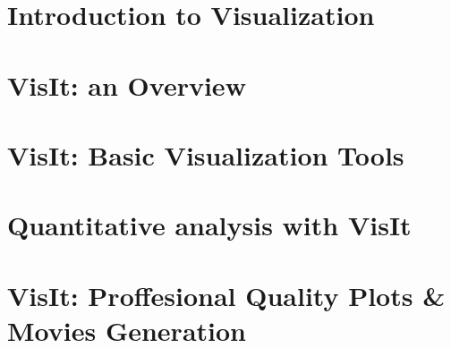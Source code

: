\documentclass[xcolor=svgnames]{beamer}
\providecommand{\sectionpage}{\Large\centering \bf\mediumblue\insertsection}
\begin{document}
\section{Introduction to Visualization}
\introEnv
\frame{\sectionpage}
  
\resetEnv

\section{VisIt: an Overview}
\basicEnv
\frame{\sectionpage}
 
\resetEnv

\section{VisIt: Basic Visualization Tools}
\basicEnv
\frame{\sectionpage}
 
 
\resetEnv

\section{Quantitative analysis with VisIt}
\normalEnv
\frame{\sectionpage}
 
\resetEnv

\section{VisIt: Proffesional Quality Plots \& Movies Generation}
\normEnv
\frame{\sectionpage}
 
\resetEnv

\end{document}
